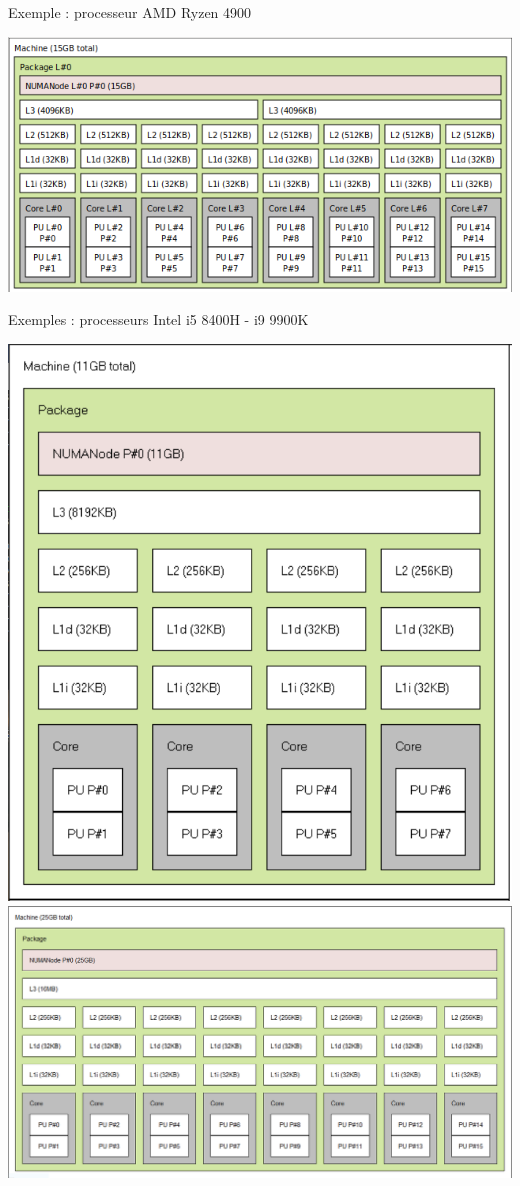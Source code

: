 \documentclass{beamer}
\begin{document}
\begin{frame}

Exemple : processeur AMD Ryzen 4900
\begin{center}
	\includegraphics[scale=0.32]{../Images/lstopo_ryzen_4900}
\end{center}

Exemples : processeurs Intel i5 8400H - i9 9900K
\begin{center}
	\includegraphics[scale=0.23]{../Images/topo_i5}
	\includegraphics[scale=0.23]{../Images/topo_i9}
\end{center}


\end{frame}
\end{document}
